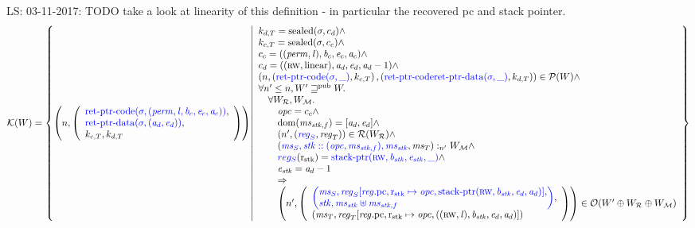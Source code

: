 \documentclass[a3paper]{article}
\newcommand\lau[1]{{\color{purple} \sf \footnotesize {LS: #1}}\\}
\newcommand{\dom}{\mathrm{dom}}
\newcommand{\npair}[2][n]{\left(#1,#2\right)}
\newcommand{\typesetlr}[1]{\mathcal{#1}}
\newcommand{\lrk}{\typesetlr{K}}
\newcommand{\lrr}{\typesetlr{R}}
\newcommand{\lro}{\typesetlr{O}}
\newcommand{\lrp}{\typesetlr{P}}
\newcommand{\lrm}{\typesetlr{M}}
\newcommand{\stpair}[3][]{
\ifthenelse{\equal{#1}{}}
{\left(\src{#2_S},#3_T\right)}
{\left(\src{#2},#3\right)}}
\newcommand{\memSat}[3][n]{#2 :_{#1}#3}
\newcommand{\future}{\sqsupseteq}
\newcommand{\pub}{\mathrm{pub}}
\newcommand{\pubft}{\future^{\pub}}
\newcommand{\sourcecolor}{\color{blue}}
\newcommand{\src}[1]{{\sourcecolor #1}}
\newcommand{\update}[2]{[#1 \mapsto #2]}
\newcommand{\updReg}[2]{\update{\reg.#1}{#2}}
\newcommand{\shareddom}[1]{\mathrm{#1}}
\newcommand{\perm}{\var{perm}}
\newcommand{\lin}{\var{l}}
\newcommand{\stkptr}[1]{\mathrm{stack\text{-}ptr}(#1)}
\newcommand{\retptrd}{\mathrm{ret\text{-}ptr\text{-}data}}
\newcommand{\retptrc}{\mathrm{ret\text{-}ptr\text{-}code}}
\newcommand{\sealed}[1]{\shareddom{sealed}(#1)}
\newcommand{\var}[1]{\mathit{#1}}
\newcommand{\reg}{\var{reg}}
\newcommand{\ms}{\var{ms}}
\newcommand{\stk}{\var{stk}}
\newcommand{\opc}{\var{opc}}
\newcommand{\baddr}{\var{b}}
\newcommand{\eaddr}{\var{e}}
\newcommand{\aaddr}{\var{a}}
\newcommand{\pcreg}{\mathrm{pc}}
\newcommand{\rstk}{\mathrm{r}_\mathrm{stk}}
\newcommand{\plainlinearity}[1]{\mathrm{#1}}
\newcommand{\linear}{\plainlinearity{linear}}
\newcommand{\plainperm}[1]{\textsc{#1}}
\newcommand{\rw}{\plainperm{rw}}
\begin{document}
\lau{03-11-2017: TODO take a look at linearity of this definition - in particular the recovered pc and stack pointer.}

\[
  \lrk(W) = \left\{ \npair{\left(\array{l}\src{\retptrc(\sigma,(\perm,\lin,\baddr_c,\eaddr_c,\aaddr_c))},\\\src{\retptrd(\sigma,(\aaddr_d,\eaddr_d))},\\k_{c,T},k_{d,T}\endarray\right)} \middle|
    \begin{array}{l}
      k_{d,T} = \sealed{\sigma,c_d} \wedge\\
      k_{c,T} = \sealed{\sigma,c_c} \wedge\\
      c_c = ((\perm,\lin),\baddr_c,\eaddr_c,\aaddr_c) \wedge\\
      c_d = ((\rw,\linear),\aaddr_d,\eaddr_d,\aaddr_d-1) \wedge\\
      \npair[n]{\stpair[.]{\retptrc(\sigma,\_)}{k_{c,T}},\stpair[.]{\retptrc{\retptrd(\sigma,\_)}}{k_{d,T}}} \in \lrp(W) \wedge \\
      \forall n' \leq n, W' \pubft W \ldotp \\
      \quad \forall W_\lrr, W_\lrm \ldotp  \\
      \qquad\opc = c_c \wedge\\
      \qquad\dom(\ms_{\stk,f}) = [\aaddr_d,\eaddr_d] \wedge\\
      \qquad\npair[n']{\stpair{\reg}{\reg}} \in \lrr(W_\lrr) \wedge\\
      \qquad\memSat[n']{\stpair[.]{\ms_S,\stk::(\opc,\ms_{\stk,f}),\ms_\stk}{\ms_T}}{W_\lrm} \wedge \\
      \qquad\src{reg_S}(\rstk) = \src{\stkptr{\rw,\baddr_\stk,\eaddr_\stk,\_}} \wedge \\
      \qquad\eaddr_\stk = \aaddr_d-1\\
      \qquad\Rightarrow\\
      \qquad\npair[n']{\left(\array{l}\src{\left(\arraycolsep=0pt\array{l}\ms_S,\reg_S\updReg{\pcreg,\rstk}{\opc,\stkptr{\rw,\baddr_\stk,\eaddr_d,\aaddr_d}},\\\stk, \ms_\stk \uplus \ms_{\stk,f}\endarray\right)},\\
                                          (\ms_T,\reg_T\updReg{\pcreg,\rstk}{\opc,((\rw,\lin),\baddr_\stk,\eaddr_d,\aaddr_d)})\endarray\right)}
      \in \lro(W' \oplus W_\lrr \oplus W_\lrm)
    \end{array}
  \right\}
\]
\end{document}
